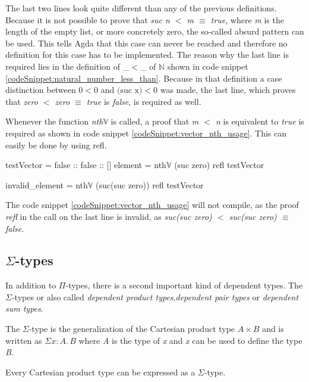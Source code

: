 The last two lines look quite different than any of the previous definitions.
Because it is not possible to prove that \emph{suc n $<$ m $\equiv$ true}, where \emph{m} is the length of the empty list, or more concretely zero, the so-called absurd pattern can be used. 
This tells Agda that this case can never be reached and therefore no definition for this case has to be implemented.
The reason why the last line is required lies in the definition of \_$<$\_ of $\mathbb{N}$ shown in code snippet \ref{codeSnippet:natural_number_less_than}.
Because in that definition a case distinction between $0 < 0$ and $\text{(suc x)} < 0$ was made, the last line, which proves that \emph{zero $<$ zero $\equiv$ true} is \emph{false}, is required as well.

Whenever the function \emph{nth$\mathbb{V}$} is called, a proof that \emph{m $<$ n} is equivalent to \emph{true} is required as shown in code snippet \ref{codeSnippet:vector_nth_usage}. This can easily be done by using refl.

\begin{codesnippet}[mathescape=true, caption={Usage of \emph{nth} function}, label={codeSnippet:vector_nth_usage}]
testVector = false :: false :: []
element = nth$\mathbb{V}$ (suc zero) refl testVector

invalid_element = nth$\mathbb{V}$ (suc(suc zero)) 
                  refl testVector
\end{codesnippet}

The code snippet \ref{codeSnippet:vector_nth_usage} will not compile, as the proof \emph{refl} in the call on the last line is invalid, as \emph{suc(suc zero) $<$ suc(suc zero) $\equiv$ false}.

\subsection{$\Sigma$-types}
In addition to $\Pi$-types, there is a second important kind of dependent types. 
The $\Sigma$-types or also called \emph{dependent product types}\cite{10.1145/2841316},\emph{dependent pair types}\cite{10.1145/2841316} or \emph{dependent sum types}\cite{10.5555/1076265}.

The $\Sigma$-type is the generalization of the Cartesian product type $A \times B$ and is written as $\Sigma x:A. \, B$ where \emph{A} is the type of \emph{x} and \emph{x} can be used to define the type \emph{B}.

Every Cartesian product type can be expressed as a $\Sigma$-type.

